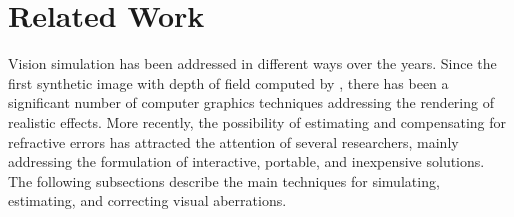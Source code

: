 
\chapter{Related Work}
\label{chap:RelatedWork}

Vision simulation has been addressed in different ways over the years. Since 
the first synthetic image with depth of field computed by \citet{Potmesil1981}, there has been a significant number of computer graphics techniques addressing the rendering of realistic effects. More recently, the possibility of estimating and compensating for refractive errors has attracted the attention of several researchers, mainly addressing the formulation of interactive, portable, and inexpensive solutions. The following subsections describe the main techniques for simulating, estimating, and correcting visual aberrations.



	

	



% 

% 

% 
